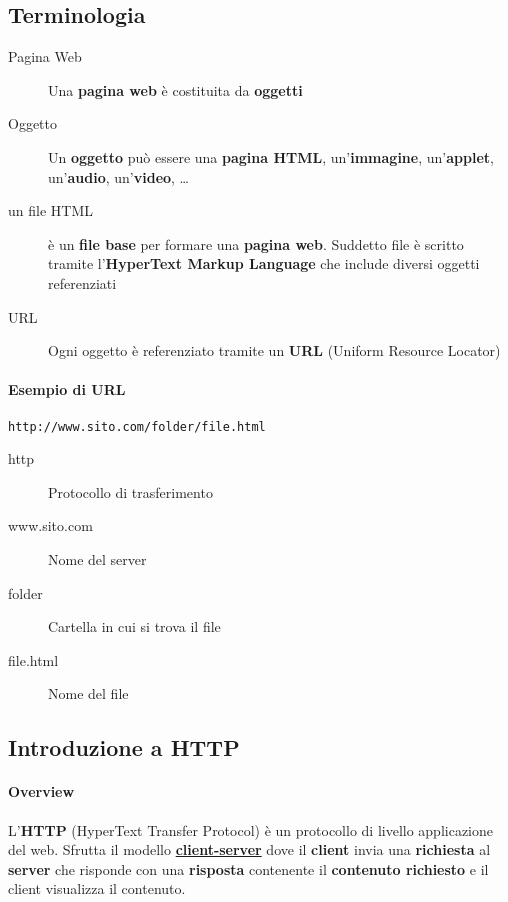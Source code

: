     \subsection{Terminologia}
        \begin{description}
            \item[Pagina Web] Una \textbf{pagina web} è costituita da \textbf{oggetti}
            \item[Oggetto] Un \textbf{oggetto} può essere una \textbf{pagina HTML}, un'\textbf{immagine}, un'\textbf{applet}, un'\textbf{audio}, un'\textbf{video}, \dots
            \item[un file HTML] è un \textbf{file base} per formare una \textbf{pagina web}. Suddetto file è scritto tramite l'\textbf{HyperText Markup Language} che include diversi oggetti referenziati
            \item[URL] Ogni oggetto è referenziato tramite un \textbf{URL} (Uniform Resource Locator)    
        \end{description}
        \paragraph{Esempio di URL}
            \begin{center}
                \texttt{http://www.sito.com/folder/file.html}
            \end{center}
            \begin{description}
                \item[http] Protocollo di trasferimento
                \item[www.sito.com] Nome del server
                \item[folder] Cartella in cui si trova il file
                \item[file.html] Nome del file
            \end{description}
    \subsection{Introduzione a HTTP}
        \paragraph{Overview} L'\textbf{HTTP} (HyperText Transfer Protocol) è un protocollo di livello applicazione del web. Sfrutta il modello \textbf{\hyperref[subsubsec:clientServer]{client-server}} dove il \textbf{client} invia una \textbf{richiesta} al \textbf{server} che risponde con una \textbf{risposta} contenente il \textbf{contenuto richiesto} e il client visualizza il contenuto.
        
